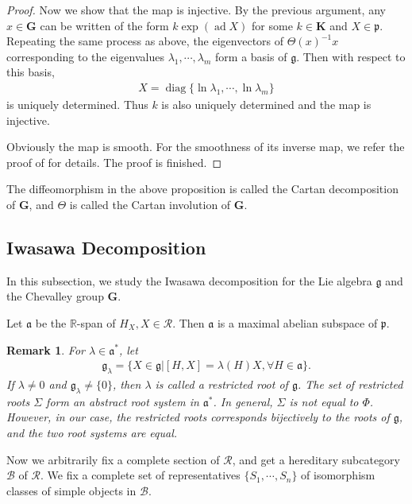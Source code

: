 \documentclass[12pt]{amsart}
\newtheorem{remark}[theorem]{Remark}
\begin{document}
\begin{proof}
Now we show that the map is injective.
By the previous argument, any $x\in \mathbf{G}$ can be written of the form $k\operatorname{exp}(\operatorname{ad}X)$ for some $k\in \mathbf{K}$ and $X\in \mathfrak{p}$. 
Repeating the same process as above, the eigenvectors of $\Theta(x)^{-1}x$ corresponding to the eigenvalues $\lambda_1,\cdots,\lambda_m$ form a basis of $\mathfrak{g}$.
Then with respect to this basis,
\begin{align*}
   X=\operatorname{diag}\{\operatorname{ln}\lambda_1,\cdots,\operatorname{ln}\lambda_m\}
\end{align*}
 is uniquely determined.
Thus $k$ is also uniquely determined and the map is injective.

Obviously the map is smooth. For the smoothness of its inverse map, we refer the proof of \cite[Theorem 6.31]{Knapp} for details.
The proof is finished.
\end{proof}

The diffeomorphism in the above proposition is called the Cartan decomposition of $\mathbf{G}$, and $\Theta$ is called the Cartan involution of $\mathbf{G}$.




\subsection{Iwasawa Decomposition}
In this subsection, we study the Iwasawa decomposition for the Lie algebra $\mathfrak{g}$ and the Chevalley group $\mathbf{G}$.

Let $\mathfrak{a}$ be the $\mathbb{R}$-span of $H_X,X\in \mathcal{R}$. 
Then $\mathfrak{a}$ is a maximal abelian subspace of $\mathfrak{p}$.

\begin{remark}
    For $\lambda\in\mathfrak{a}^*$, let 
    \begin{align*}
        \mathfrak{g}_{\lambda}=\{X\in \mathfrak{g}|[H,X]=\lambda(H)X, \forall H\in \mathfrak{a}  \}.
    \end{align*}
    If $\lambda\neq 0$ and $\mathfrak{g}_{\lambda}\neq \{0\}$, then $\lambda$ is called a restricted root of $\mathfrak{g}$.
    The set of restricted roots $\Sigma$ form an abstract root system in $\mathfrak{a}^*$.
    In general, $\Sigma$ is not equal to $\Phi$.
    However, in our case, the restricted roots corresponds bijectively to the roots of $\mathfrak{g}$, and the two root systems are equal.
\end{remark}

Now we arbitrarily fix a complete section of $\mathcal{R}$, and get a hereditary subcategory $\mathcal{B}$ of $\mathcal{R}$.
We fix a complete set of representatives $\{S_1,\cdots,S_n\}$ of isomorphism classes of simple objects in $\mathcal{B}$.
\end{document}
